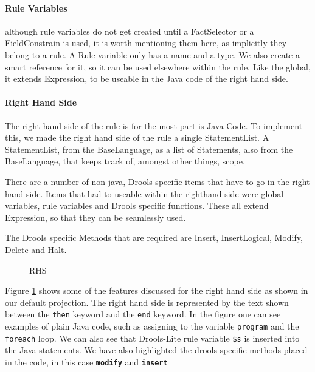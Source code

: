 \paragraph{Rule Variables} although rule variables do not get created until a FactSelector or a FieldConstrain is used, it is worth mentioning them here, as implicitly they belong to a rule.
A Rule variable only has a name and a type.
We also create a smart reference for it, so it can be used elsewhere within the rule.
Like the global, it extends Expression, to be useable in the Java code of the right hand side.

\paragraph{Right Hand Side}
The right hand side of the rule is for the most part is Java Code.
To implement this, we made the right hand side of the rule a single StatementList.
A StatementList, from the BaseLanguage, as a list of Statements, also from the BaseLanguage, that keeps track of, amongst other things, scope.

There are a number of non-java, Drools specific items that have to go in the right hand side.
Items that had to useable within the righthand side were global variables, rule variables and Drools specific functions.
These all extend Expression, so that they can be seamlessly used.

The Drools specific Methods that are required are Insert, InsertLogical, Modify, Delete and Halt.

\begin{figure}[!h]
    \centering
    \caption{RHS}
    \label{fig:RHS}
\end{figure}

Figure \ref{fig:RHS} shows some of the features discussed for the right hand side as shown in our default projection.
The right hand side is represented by the text shown between the \texttt{then} keyword and the \texttt{end} keyword.
In the figure one can see examples of plain Java code, such as assigning to the variable \texttt{program} and the \texttt{foreach} loop.
We can also see that Drools-Lite rule variable \texttt{\$s} is inserted into the Java statements.
We have also highlighted the drools specific methods placed in the code, in this case \texttt{\textbf{modify}} and \texttt{\textbf{insert}}   

